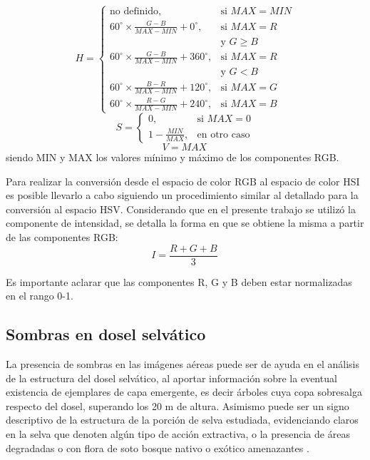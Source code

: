 \begin{equation}
    {\displaystyle H={\begin{cases}{\mbox{no definido}},&{\mbox{si }}MAX=MIN\\60^{\circ }\times {\frac {G-B}{MAX-MIN}}+0^{\circ },&{\mbox{si }}MAX=R\\&{\mbox{y }}G\geq B\\60^{\circ }\times {\frac {G-B}{MAX-MIN}}+360^{\circ },&{\mbox{si }}MAX=R\\&{\mbox{y }}G<B\\60^{\circ }\times {\frac {B-R}{MAX-MIN}}+120^{\circ },&{\mbox{si }}MAX=G\\60^{\circ }\times {\frac {R-G}{MAX-MIN}}+240^{\circ },&{\mbox{si }}MAX=B\end{cases}}}
\end{equation}
\begin{equation}
    {\displaystyle S={\begin{cases}0,&{\mbox{si }}MAX=0\\1-{\frac {MIN}{MAX}},&{\mbox{en otro caso}}\end{cases}}}
\end{equation}
\begin{equation}
    {\displaystyle V=MAX\,}
\end{equation}
siendo MIN y MAX los valores mínimo y máximo de los componentes RGB.

Para realizar la conversión desde el espacio de color RGB al espacio de color HSI es posible llevarlo a cabo siguiendo un procedimiento similar al detallado para la conversión al espacio HSV. Considerando que en el presente trabajo se utilizó la componente de intensidad, se detalla la forma en que se obtiene la misma a partir de las componentes RGB:
\begin{equation}
    {\displaystyle I=\frac{R+G+B}{3}\,}
\end{equation}

Es importante aclarar que las componentes R, G y B deben estar normalizadas en el rango 0-1.
\subsection{Sombras en dosel selvático}
La presencia de sombras en las imágenes aéreas puede ser de ayuda en el análisis de la estructura del dosel selvático, al aportar información sobre la eventual existencia de ejemplares de capa emergente, es decir árboles cuya copa sobresalga respecto del dosel, superando los 20 m de altura. Asimismo puede ser un signo descriptivo de la estructura de la porción de selva estudiada, evidenciando claros en la selva que denoten algún tipo de acción extractiva, o la presencia de áreas degradadas o con flora de soto bosque nativo o exótico amenazantes \cite{bedrij_selective_2022}.

